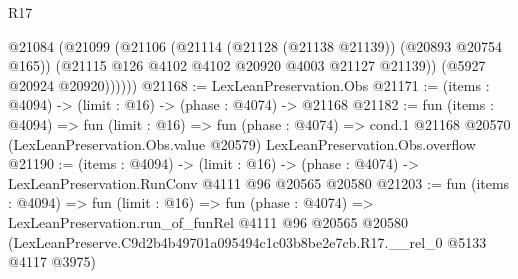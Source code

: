 \begin{lexlean}{R17}
\begin{coremodule}
          @21084
            (@21099
              (@21106
                (@21114 (@21128 (@21138 @21139)) (@20893 @20754 @165))
                (@21115 @126 @4102 @4102 @20920 @4003 @21127 @21139))
              (@5927 @20924 @20920))))))
@21168 := LexLeanPreservation.Obs
@21171 := (items : @4094) -> (limit : @16) -> (phase : @4074) -> @21168
@21182 := fun (items : @4094) =>
  fun (limit : @16) =>
  fun (phase : @4074) =>
  cond.{1} @21168 @20570 (LexLeanPreservation.Obs.value @20579) LexLeanPreservation.Obs.overflow
@21190 := (items : @4094) ->
  (limit : @16) -> (phase : @4074) -> LexLeanPreservation.RunConv @4111 @96 @20565 @20580
@21203 := fun (items : @4094) =>
  fun (limit : @16) =>
  fun (phase : @4074) =>
  LexLeanPreservation.run_of_funRel
    @4111
    @96
    @20565
    @20580
    (LexLeanPreserve.C9d2b4b49701a095494c1c03b8be2e7cb.R17.__rel_0 @5133 @4117 @3975)
\end{coremodule}
\end{lexlean}
